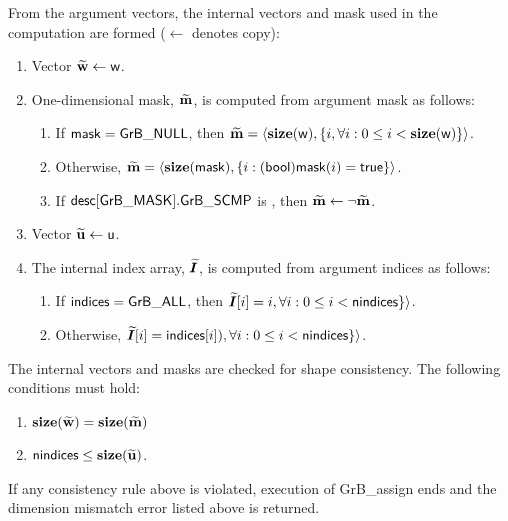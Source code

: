 From the argument vectors, the internal vectors and mask used in 
the computation are formed ($\leftarrow$ denotes copy):
\begin{enumerate}
	\item Vector ${\bf \widetilde{w}} \leftarrow {\sf w}$.

	\item One-dimensional mask, ${\bf \widetilde{m}}$, is computed from 
    argument {\sf mask} as follows:
	\begin{enumerate}
		\item	If ${\sf mask} = {\sf GrB\_NULL}$, then ${\bf \widetilde{m}} = 
        \langle \bold{size}({\sf w}), \{i, \forall i : 0 \leq i < 
        \bold{size}({\sf w}) \} \rangle$.

		\item	Otherwise, ${\bf \widetilde{m}} = 
        \langle \bold{size}({\sf mask}), \{i : ({\sf bool}){\sf mask}(i) = 
        {\sf true}\} \rangle$.

		\item	If ${\sf desc[GrB\_MASK].GrB\_SCMP}$ is \true, then ${\bf \widetilde{m}} \leftarrow \neg {\bf \widetilde{m}}$.
	\end{enumerate}

	\item Vector ${\bf \widetilde{u}} \leftarrow {\sf u}$.
    
        \item The internal index array, $\bm{\widetilde{I}}$, is computed from argument {\sf indices} as follows:
	\begin{enumerate}
		\item	If ${\sf indices} = {\sf GrB\_ALL}$, then $\bm{\widetilde{I}}[i] = i                , \forall i : 0 \leq i < {\sf nindices} \} \rangle$.

		\item	Otherwise,                                $\bm{\widetilde{I}}[i] = {\sf indices}[i]), \forall i : 0 \leq i < {\sf nindices} \} \rangle$.
        \end{enumerate}
\end{enumerate}

The internal vectors and masks are checked for shape consistency. The following 
conditions must hold:
\begin{enumerate}
	\item $\bold{size}({\bf \widetilde{w}}) = \bold{size}({\bf \widetilde{m}})$
    \item ${\sf nindices} \leq \bold{size}({\bf \widetilde{u}})$.
\end{enumerate}
If any consistency rule above is violated, execution of {\sf GrB\_assign} ends and 
the dimension mismatch error listed above is returned.

